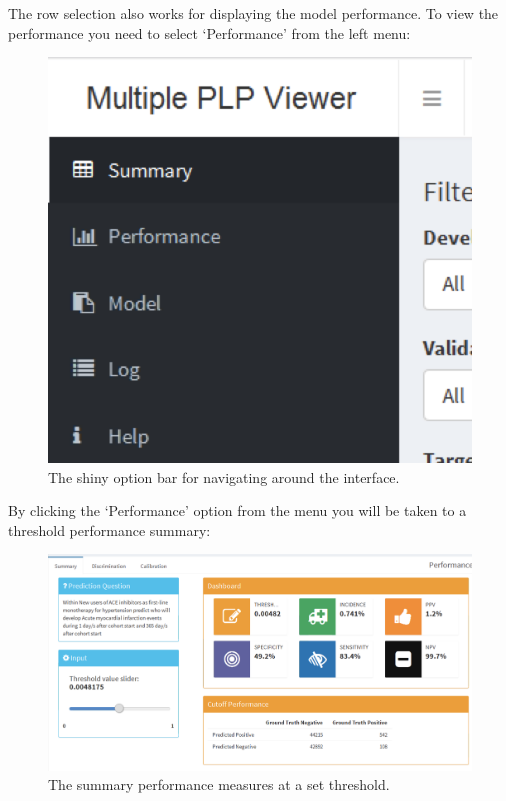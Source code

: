 \documentclass[11pt]{book}
\begin{document}
The row selection also works for displaying the model performance. To
view the performance you need to select `Performance' from the left
menu:

\begin{figure}

{\centering \includegraphics[width=0.8\linewidth]{images/PatientLevelPrediction/shiny/shinyBar} 

}

\caption{The shiny option bar for navigating around the interface.}\label{fig:shinyBar}
\end{figure}

By clicking the `Performance' option from the menu you will be taken to
a threshold performance summary:

\begin{figure}

{\centering \includegraphics[width=0.8\linewidth]{images/PatientLevelPrediction/shiny/shinyPerformanceSum} 

}

\caption{The summary performance measures at a set threshold.}\label{fig:shinyPerformanceSum}
\end{figure}
\end{document}
